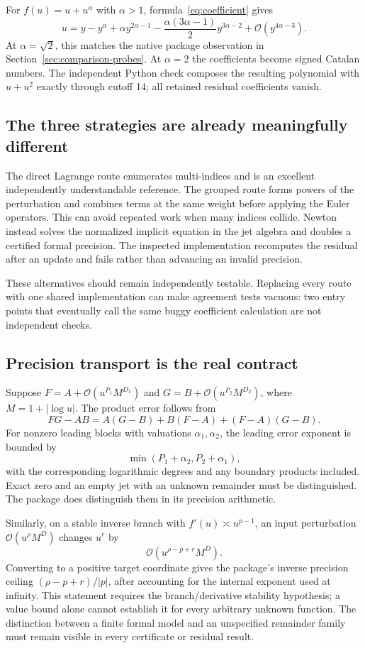 \documentclass[11pt,a4paper]{article}
\newcommand{\OO}{\mathcal O}
\begin{document}
For $f(u)=u+u^\alpha$ with $\alpha>1$, formula~\eqref{eq:coefficient} gives
\begin{equation}\label{eq:irr}
 u=y-y^\alpha+\alpha y^{2\alpha-1}
 -\frac{\alpha(3\alpha-1)}{2}y^{3\alpha-2}
 +\OO(y^{4\alpha-3}).
\end{equation}
At $\alpha=\sqrt2$, this matches the native package observation in Section~\ref{sec:comparison-probes}. At $\alpha=2$ the coefficients become signed Catalan numbers. The independent Python check composes the resulting polynomial with $u+u^2$ exactly through cutoff 14; all retained residual coefficients vanish.

\subsection{The three strategies are already meaningfully different}
The direct Lagrange route enumerates multi-indices and is an excellent independently understandable reference. The grouped route forms powers of the perturbation and combines terms at the same weight before applying the Euler operators. This can avoid repeated work when many indices collide. Newton instead solves the normalized implicit equation in the jet algebra and doubles a certified formal precision. The inspected implementation recomputes the residual after an update and fails rather than advancing an invalid precision.\cite{incremental}

These alternatives should remain independently testable. Replacing every route with one shared implementation can make agreement tests vacuous: two entry points that eventually call the same buggy coefficient calculation are not independent checks.

\subsection{Precision transport is the real contract}
Suppose $F=A+\OO(u^{P_1}M^{D_1})$ and $G=B+\OO(u^{P_2}M^{D_2})$, where $M=1+|\log u|$. The product error follows from
\[
 FG-AB=A(G-B)+B(F-A)+(F-A)(G-B).
\]
For nonzero leading blocks with valuations $\alpha_1,\alpha_2$, the leading error exponent is bounded by
\[
 \min(P_1+\alpha_2,P_2+\alpha_1),
\]
with the corresponding logarithmic degrees and any boundary products included. Exact zero and an empty jet with an unknown remainder must be distinguished. The package does distinguish them in its precision arithmetic.\cite{main,calculus}

Similarly, on a stable inverse branch with $f'(u)\asymp u^{p-1}$, an input perturbation $\OO(u^\rho M^D)$ changes $u^r$ by
\begin{equation}\label{eq:inversecap}
 \OO(u^{\rho-p+r}M^D).
\end{equation}
Converting to a positive target coordinate gives the package's inverse precision ceiling $(\rho-p+r)/|p|$, after accounting for the internal exponent used at infinity. This statement requires the branch/derivative stability hypothesis; a value bound alone cannot establish it for every arbitrary unknown function. The distinction between a finite formal model and an unspecified remainder family must remain visible in every certificate or residual result.\cite{main,certificates}
\end{document}
